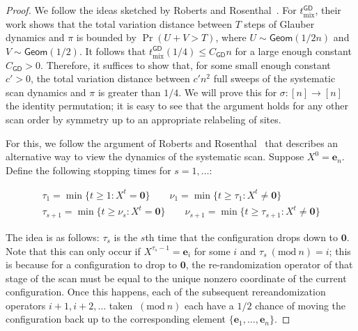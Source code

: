 \documentclass[11pt]{article}
\newcommand{\Mod}[1]{\ (\mathrm{mod}\ #1)}
\begin{document}
\begin{proof}
    We follow the ideas sketched by Roberts and Rosenthal~\cite{roberts2015surprising}. For $t_{\mathrm{mix}}^{\mathsf{GD}}$, their work shows that the total variation distance between $T$ steps of Glauber dynamics and $\pi$ is bounded by $\Pr(U+V>T)$, where $U\sim \mathsf{Geom}(1/2n)$ and $V\sim \mathsf{Geom}(1/2)$. It follows that $t_{\mathrm{mix}}^{\mathsf{GD}}(1/4)\leq C_{\mathsf{GD}}n$ for a large enough constant $C_{\mathsf{GD}}>0$. Therefore, it suffices to show that, for some small enough constant $c'>0$, the total variation distance between $c'n^2$ full sweeps of the systematic scan dynamics and $\pi$ is greater than $1/4$. We will prove this for $\sigma:[n]\to [n]$ the identity permutation; it is easy to see that the argument holds for any other scan order by symmetry up to an appropriate relabeling of sites.

    For this, we follow the argument of Roberts and Rosenthal~\cite{roberts2015surprising} that describes an alternative way to view the dynamics of the systematic scan. Suppose $X^0=\bm{e}_n$. Define the following stopping times for $s=1,\ldots$:

    \begin{gather*}
        \tau_1 = \min\{t\geq 1: X^t =\bm{0}\}\quad\quad \nu_1 =\min\{t\geq \tau_1: X^t \neq\bm{0}\}\\
        \tau_{s+1}=\min\{t\geq \nu_s: X^t =\bm{0}\}\quad\quad \nu_{s+1}=\min\{t\geq \tau_{s+1}: X^t\neq\bm{0}\}
    \end{gather*}

    The idea is as follows: $\tau_s$ is the $s$th time that the configuration drops down to $\bm{0}$. Note that this can only occur if $X^{\tau_s-1}=\bm{e}_i$ for some $i$ and $\tau_s\Mod n = i$; this is because for a configuration to drop to $\bm{0}$, the re-randomization operator of that stage of the scan must be equal to the unique nonzero coordinate of the current configuration. Once this happens, each of the subsequent rereandomization operators $i+1,i+2,\ldots$ taken $\Mod n$ each have a $1/2$ chance of moving the configuration back up to the corresponding element $\{\bm{e}_1,\ldots,\bm{e}_n\}$. 


\end{proof}
\end{document}
